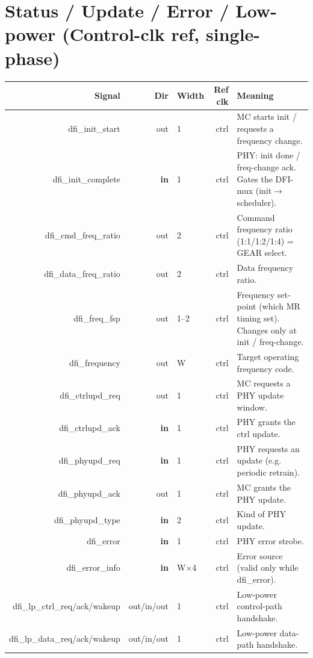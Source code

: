 \documentclass[9pt]{extarticle}
\newenvironment{ports}{%
  \footnotesize\begin{longtable}{N D W R X}\toprule
  \textbf{Signal} & \textbf{Dir} & \textbf{Width} & \textbf{Ref clk} & \textbf{Meaning}\\ \midrule\endhead}
  {\bottomrule\end{longtable}}
\begin{document}
\section{\textcolor{ctrl}{Status / Update / Error / Low-power} (Control-clk ref, single-phase)}
\begin{ports}
dfi\_init\_start     & out & 1 & ctrl & MC starts init / requests a frequency change.\\
dfi\_init\_complete  & \textbf{in} & 1 & ctrl & PHY: init done / freq-change ack. Gates the DFI-mux (init$\rightarrow$scheduler).\\
dfi\_cmd\_freq\_ratio& out & 2 & ctrl & Command frequency ratio (1:1/1:2/1:4) = GEAR select.\\
dfi\_data\_freq\_ratio& out & 2 & ctrl & Data frequency ratio.\\
dfi\_freq\_fsp       & out & 1--2 & ctrl & Frequency set-point (which MR timing set). Changes only at init / freq-change.\\
dfi\_frequency       & out & W & ctrl & Target operating frequency code.\\
dfi\_ctrlupd\_req    & out & 1 & ctrl & MC requests a PHY update window.\\
dfi\_ctrlupd\_ack    & \textbf{in} & 1 & ctrl & PHY grants the ctrl update.\\
dfi\_phyupd\_req     & \textbf{in} & 1 & ctrl & PHY requests an update (e.g. periodic retrain).\\
dfi\_phyupd\_ack     & out & 1 & ctrl & MC grants the PHY update.\\
dfi\_phyupd\_type    & \textbf{in} & 2 & ctrl & Kind of PHY update.\\
dfi\_error          & \textbf{in} & 1 & ctrl & PHY error strobe.\\
dfi\_error\_info    & \textbf{in} & W$\times$4 & ctrl & Error source (valid only while dfi\_error).\\
dfi\_lp\_ctrl\_req/ack/wakeup & out/in/out & 1 & ctrl & Low-power control-path handshake.\\
dfi\_lp\_data\_req/ack/wakeup & out/in/out & 1 & ctrl & Low-power data-path handshake.\\
\end{ports}
\end{document}
